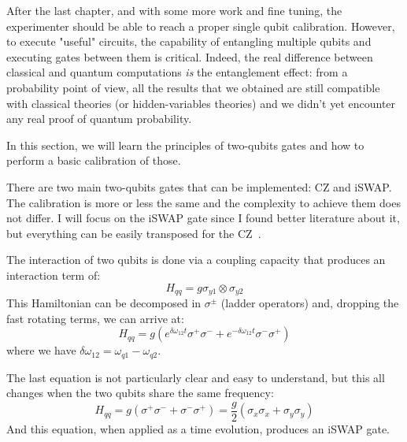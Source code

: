 
After the last chapter, and with some more work and fine tuning, the experimenter should be able to reach a proper single qubit calibration.
However, to execute "useful" circuits, the capability of entangling multiple qubits and executing gates between them is critical.
Indeed, the real difference between classical and quantum computations \textit{is} the entanglement effect: from a probability point of view, all the results that we obtained are still compatible with classical theories (or hidden-variables theories) and we didn't yet encounter any real proof of quantum probability.

In this section, we will learn the principles of two-qubits gates and how to perform a basic calibration of those.

There are two main two-qubits gates that can be implemented: CZ and iSWAP.
The calibration is more or less the same and the complexity to achieve them does not differ. 
I will focus on the iSWAP gate since I found better literature about it, but everything can be easily transposed for the CZ~\cite{Krantz2016, DiCarlo2009, McKay2017}.


The interaction of two qubits is done via a coupling capacity that produces an interaction term of:
\begin{equation}
    H_{qq} = g \sigma_{y1} \otimes \sigma_{y2}
\end{equation}
This Hamiltonian can be decomposed in $\sigma^\pm$ (ladder operators) and, dropping the fast rotating terms, we can arrive at:
\begin{equation}
    H_{qq} = g (e^{\delta \omega_{12}t}\sigma^+ \sigma^- + e^{-\delta \omega_{12}t}\sigma^- \sigma^+)
\end{equation}
where we have $\delta \omega_{12}= \omega_{q1} - \omega_{q2}$.

The last equation is not particularly clear and easy to understand, but this all changes when the two qubits share the same frequency:
\begin{equation}
    H_{qq}=g(\sigma^+\sigma^- + \sigma^-\sigma^+) = \frac{g}{2}(\sigma_x \sigma_x + \sigma_y \sigma_y)
\end{equation}
And this equation, when applied as a time evolution, produces an iSWAP gate.

